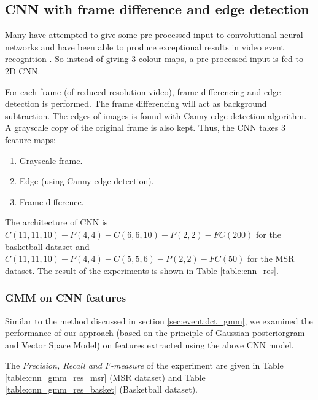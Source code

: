 \subsection{CNN with frame difference and edge detection}

Many have attempted to give some pre-processed input to convolutional neural networks and have been able to produce exceptional results in video event recognition \citep{ji20133d}.  So instead of giving 3 colour maps, a pre-processed input is fed to 2D CNN.

For each frame (of reduced resolution video), frame differencing and edge detection is performed.  The frame differencing will act as background subtraction.  The edges of images is found with Canny edge detection algorithm.  A grayscale copy of the original frame is also kept.  Thus, the CNN takes 3 feature maps:
\begin{enumerate}
\item Grayscale frame.
\item Edge (using Canny edge detection).
\item Frame difference.
\end{enumerate}

The architecture of CNN is $C(11, 11, 10)-P(4, 4)-C(6, 6, 10)-P(2, 2)-FC(200)$ for the basketball dataset and $C(11, 11, 10)-P(4,4)-C(5, 5, 6)-P(2,2)-FC(50)$ for the MSR dataset.  The result of the experiments is shown in Table \ref{table:cnn_res}.


\subsubsection{GMM on CNN features}
Similar to the method discussed in section \ref{sec:event:dct_gmm}, we examined the performance of our approach (based on the principle of Gaussian posteriorgram and Vector Space Model) on features extracted using the above CNN model.

The \textit{Precision, Recall and F-measure} of the experiment are given in Table \ref{table:cnn_gmm_res_msr} (MSR dataset) and Table \ref{table:cnn_gmm_res_basket} (Basketball dataset).


